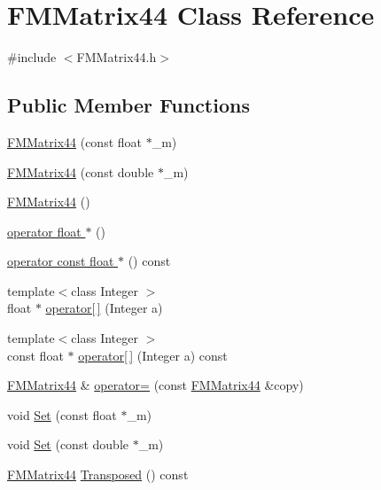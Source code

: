 \hypertarget{classFMMatrix44}{
\section{FMMatrix44 Class Reference}
\label{classFMMatrix44}
}


{\ttfamily \#include $<$FMMatrix44.h$>$}

\subsection*{Public Member Functions}
\begin{DoxyCompactItemize}
\item 
\hyperlink{classFMMatrix44_ada7f9c617a9f990d868c984fcac85a6a}{FMMatrix44} (const float $\ast$\_\-m)
\item 
\hyperlink{classFMMatrix44_a341bbaaa668c598cfc736df0f5078d14}{FMMatrix44} (const double $\ast$\_\-m)
\item 
\hyperlink{classFMMatrix44_a4be1466ca31038675d9b74f260529a91}{FMMatrix44} ()
\item 
\hyperlink{classFMMatrix44_af14d21c32d852a9c6f70e198df360276}{operator float $\ast$} ()
\item 
\hyperlink{classFMMatrix44_ae57b4d31db4f88641f33bcb2550e9350}{operator const float $\ast$} () const 
\item 
{\footnotesize template$<$class Integer $>$ }\\float $\ast$ \hyperlink{classFMMatrix44_ad9de3c3698f8f4adcae38998a126edd8}{operator\mbox{[}$\,$\mbox{]}} (Integer a)
\item 
{\footnotesize template$<$class Integer $>$ }\\const float $\ast$ \hyperlink{classFMMatrix44_a23ddea9c722a65c235e5bac276166f67}{operator\mbox{[}$\,$\mbox{]}} (Integer a) const 
\item 
\hyperlink{classFMMatrix44}{FMMatrix44} \& \hyperlink{classFMMatrix44_a0e5dcb565721c69fa535ff86516051e6}{operator=} (const \hyperlink{classFMMatrix44}{FMMatrix44} \&copy)
\item 
void \hyperlink{classFMMatrix44_acec94b027967c367a76f22a458f1dd75}{Set} (const float $\ast$\_\-m)
\item 
void \hyperlink{classFMMatrix44_ad96511998f75e4a627765e773e9dbfc6}{Set} (const double $\ast$\_\-m)
\item 
\hyperlink{classFMMatrix44}{FMMatrix44} \hyperlink{classFMMatrix44_a819cba3d3436d54f60b23063d9c183cb}{Transposed} () const 
\item 

\end{DoxyCompactItemize}
